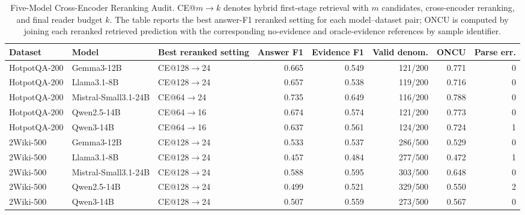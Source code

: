\begin{table}[!t]
\renewcommand{\arraystretch}{1.08}
\caption{Five-Model Cross-Encoder Reranking Audit. CE@$m\rightarrow k$ denotes hybrid first-stage retrieval with $m$ candidates, cross-encoder reranking, and final reader budget $k$. The table reports the best answer-F1 reranked setting for each model--dataset pair; ONCU is computed by joining each reranked retrieved prediction with the corresponding no-evidence and oracle-evidence references by sample identifier.}
\label{tab:five_model_ce_rerank_audit}
\centering
\scriptsize
\setlength{\tabcolsep}{3pt}
\begin{tabular}{lllrrrrr}
\toprule
Dataset & Model & Best reranked setting & Answer F1 & Evidence F1 & Valid denom. & ONCU & Parse err. \\
\midrule
HotpotQA-200 & Gemma3-12B & CE@128$\rightarrow$24 & 0.665 & 0.549 & 121/200 & 0.771 & 0 \\
HotpotQA-200 & Llama3.1-8B & CE@128$\rightarrow$24 & 0.657 & 0.538 & 119/200 & 0.716 & 0 \\
HotpotQA-200 & Mistral-Small3.1-24B & CE@64$\rightarrow$24 & 0.735 & 0.649 & 116/200 & 0.788 & 0 \\
HotpotQA-200 & Qwen2.5-14B & CE@64$\rightarrow$16 & 0.674 & 0.574 & 121/200 & 0.773 & 0 \\
HotpotQA-200 & Qwen3-14B & CE@64$\rightarrow$16 & 0.637 & 0.561 & 124/200 & 0.724 & 1 \\
2Wiki-500 & Gemma3-12B & CE@128$\rightarrow$24 & 0.533 & 0.537 & 286/500 & 0.529 & 0 \\
2Wiki-500 & Llama3.1-8B & CE@128$\rightarrow$24 & 0.457 & 0.484 & 277/500 & 0.472 & 1 \\
2Wiki-500 & Mistral-Small3.1-24B & CE@128$\rightarrow$24 & 0.588 & 0.595 & 303/500 & 0.648 & 0 \\
2Wiki-500 & Qwen2.5-14B & CE@128$\rightarrow$24 & 0.499 & 0.521 & 329/500 & 0.550 & 2 \\
2Wiki-500 & Qwen3-14B & CE@128$\rightarrow$24 & 0.507 & 0.559 & 273/500 & 0.567 & 0 \\
\bottomrule
\end{tabular}
\end{table}
